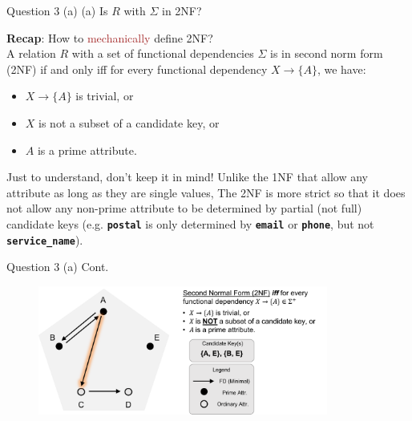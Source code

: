 \begin{frame}[fragile]{Question 3 (a)}
(a) Is $R$ with $\Sigma$ in 2NF?\\\vspace{10pt}

\textbf{Recap}: How to \textcolor{brown}{mechanically} define 2NF?\\\vspace{10pt}
A relation $R$ with a set of functional dependencies $\Sigma$ is in second norm form (2NF) if and only iff for every functional dependency $X\rightarrow\{A\}$, we have:
\begin{itemize}
	\item $X\rightarrow\{A\}$ is trivial, or
	\item $X$ is not a subset of a candidate key, or
	\item $A$ is a prime attribute.
\end{itemize}\vspace{10pt}

\begin{alertblock}{Just to understand, don't keep it in mind!}
	Unlike the 1NF that allow any attribute as long as they are single values, 
	The 2NF is more strict so that it does not allow any non-prime attribute to be determined by partial (not full) candidate keys (e.g. \texttt{\textbf{postal}} is only determined by \texttt{\textbf{email}} or \texttt{\textbf{phone}}, but not \texttt{\textbf{service\_name}}).
\end{alertblock}

\end{frame}

\begin{frame}[fragile]{Question 3 (a) Cont.}
\begin{figure}
	\includegraphics[width=0.85\textwidth, trim=0 0 0 0, clip]{t5/images/q3_2nf_highlight.png}
\end{figure}
\end{frame}


